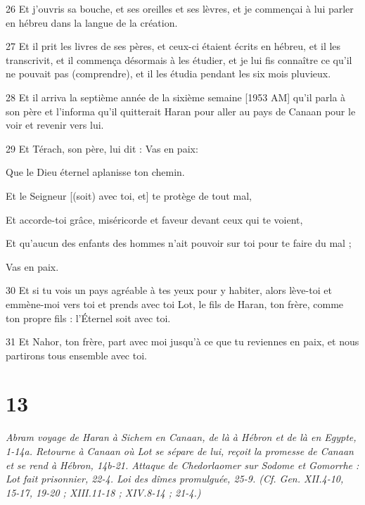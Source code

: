 \par 26 Et j'ouvris sa bouche, et ses oreilles et ses lèvres, et je commençai à lui parler en hébreu dans la langue de la création.
\par 27 Et il prit les livres de ses pères, et ceux-ci étaient écrits en hébreu, et il les transcrivit, et il commença désormais à les étudier, et je lui fis connaître ce qu'il ne pouvait pas (comprendre), et il les étudia pendant les six mois pluvieux.
\par 28 Et il arriva la septième année de la sixième semaine [1953 AM] qu'il parla à son père et l'informa qu'il quitterait Haran pour aller au pays de Canaan pour le voir et revenir vers lui.
\par 29 Et Térach, son père, lui dit : Vas en paix:
\par    
\par     Que le Dieu éternel aplanisse ton chemin.  
\par     Et le Seigneur [(soit) avec toi, et] te protège de tout mal,  
\par     Et accorde-toi grâce, miséricorde et faveur devant ceux qui te voient,  
\par     Et qu'aucun des enfants des hommes n'ait pouvoir sur toi pour te faire du mal ;  
\par     Vas en paix.
\par    
\par 30 Et si tu vois un pays agréable à tes yeux pour y habiter, alors lève-toi et emmène-moi vers toi et prends avec toi Lot, le fils de Haran, ton frère, comme ton propre fils : l'Éternel soit avec toi.
\par 31 Et Nahor, ton frère, part avec moi jusqu'à ce que tu reviennes en paix, et nous partirons tous ensemble avec toi.

\chapter{13}

\par \textit{Abram voyage de Haran à Sichem en Canaan, de là à Hébron et de là en Egypte, 1-14a. Retourne à Canaan où Lot se sépare de lui, reçoit la promesse de Canaan et se rend à Hébron, 14b-21. Attaque de Chedorlaomer sur Sodome et Gomorrhe : Lot fait prisonnier, 22-4. Loi des dîmes promulguée, 25-9. (Cf. Gen. XII.4-10, 15-17, 19-20 ; XIII.11-18 ; XIV.8-14 ; 21-4.)}

